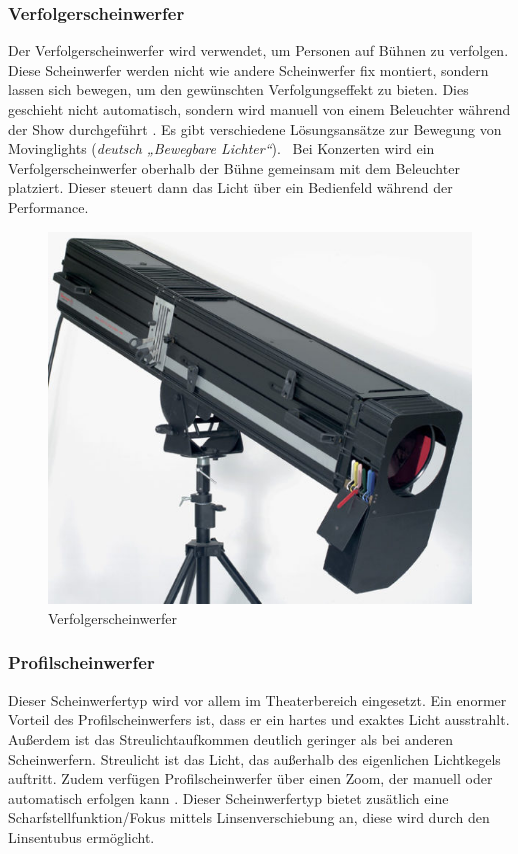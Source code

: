 \subsubsection{Verfolgerscheinwerfer}
Der Verfolgerscheinwerfer wird verwendet, um Personen auf Bühnen zu verfolgen. Diese Scheinwerfer werden nicht wie andere Scheinwerfer fix montiert, sondern lassen sich bewegen, um den gewünschten Verfolgungseffekt zu bieten. Dies geschieht nicht automatisch, sondern wird manuell von einem Beleuchter während der Show durchgeführt \textcite{Verfolgerscheinwerfer}. Es gibt verschiedene Lösungsansätze zur Bewegung von Movinglights (\emph{deutsch „Bewegbare Lichter“}). \ Bei Konzerten wird ein Verfolgerscheinwerfer oberhalb der Bühne gemeinsam mit dem Beleuchter platziert. Dieser steuert dann das Licht über ein Bedienfeld während der Performance.\\


\begin{figure}[H]
	\centering
	\includegraphics[width=0.7\linewidth]{images/Verfolgerscheinwerfer.jpg}
	\caption[Verfolgerscheinwerfer]{Verfolgerscheinwerfer}
	\label{fig:Verfolgerscheinwerfer}
\end{figure}

\subsubsection{Profilscheinwerfer}
Dieser Scheinwerfertyp wird vor allem im Theaterbereich eingesetzt. Ein enormer Vorteil des Profilscheinwerfers ist, dass er ein hartes und exaktes Licht ausstrahlt. Außerdem ist das Streulichtaufkommen deutlich geringer als bei anderen Scheinwerfern. Streulicht ist das Licht, das außerhalb des eigenlichen Lichtkegels auftritt. Zudem verfügen Profilscheinwerfer über einen Zoom, der manuell oder automatisch erfolgen kann \textcite{Profilscheinwerfer}. Dieser Scheinwerfertyp bietet zusätlich eine Scharfstellfunktion/Fokus mittels Linsenverschiebung an, diese wird durch den Linsentubus ermöglicht.\\



